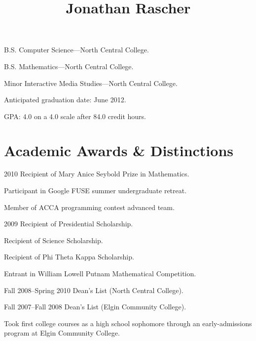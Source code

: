 \documentclass{simplecv}
\begin{document}
  \leftheader{
    \contactemail \\
    \contactphone
  }

  \rightheader{
    \contactaddressone \\
    \contactaddresstwo
  }

  \title{Jonathan Rascher}
  \maketitle

  \begin{topic}
    \item[B.S.] Computer Science---North Central College.

    \item[B.S.] Mathematics---North Central College.

    \item[Minor] Interactive Media Studies---North Central College.

    \item Anticipated graduation date: June 2012.

    \item GPA: 4.0 on a 4.0 scale after 84.0 credit hours.
  \end{topic}

  \section{Academic Awards \& Distinctions}
  \begin{topic}
    \item[2010] Recipient of Mary Anice Seybold Prize in Mathematics.

    Participant in Google FUSE summer undergraduate retreat.

    Member of ACCA programming contest advanced team.

    \item[2009] Recipient of Presidential Scholarship.

    Recipient of Science Scholarship.

    Recipient of Phi Theta Kappa Scholarship.

    Entrant in William Lowell Putnam Mathematical Competition.

    \item[Fall 2008--Spring 2010] Dean's List (North Central College).

    \item[Fall 2007--Fall 2008] Dean's List (Elgin Community College).

    \item Took first college courses as a high school sophomore through an early-admissions program at Elgin Community College.
  \end{topic}
\end{document}
